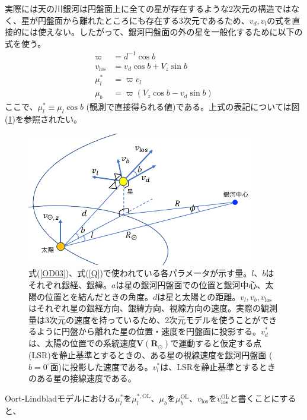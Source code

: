 実際には天の川銀河は円盤面上に全ての星が存在するような2次元の構造ではなく、星が円盤面から離れたところにも存在する3次元であるため、$v_d,v_l$の式を直接的には使えない。したがって、銀河円盤面の外の星を一般化するために以下の式を使う。
\begin{subequations}
\begin{align}
	\varpi &= d^{-1} \cos b \\
	v_{\mathrm{los}} &= v_d \cos b + V_z \sin b\\
	\mu^*_l &= \varpi v_l \\
	\mu_b &= \varpi(V_z \cos b - v_d \sin b)
\end{align} \label{OD03}
\end{subequations}
ここで、$\mu^*_l \equiv \mu_l \cos b$ (観測で直接得られる値)である。上式の表記については図(\ref{fig:OD03})を参照されたい。
\begin{figure}[htbp]
\begin{center}
	\includegraphics[width=10cm]{fig/figOD2003.pdf}
	\caption{式(\ref{OD03})、式(\ref{Q})で使われている各パラメータが示す量。$l、b$はそれぞれ銀経、銀緯。$a$は星の銀河円盤面での位置と銀河中心、太陽の位置とを結んだときの角度。$d$は星と太陽との距離。$v_l,v_b,v_{\mathrm{los}}$はそれぞれ星の銀経方向、銀緯方向、視線方向の速度。実際の観測量は3次元の速度を持っているため、2次元モデルを使うことができるように円盤から離れた星の位置・速度を円盤面に投影する。$v^*_d$は、太陽の位置での系統速度$\pmb{V}(\pmb{R}_{\odot})$で運動すると仮定する点 (LSR)を静止基準とするときの、ある星の視線速度を銀河円盤面 ($b=0^{\circ}$面)に投影した速度である。$v^*_l$は、LSRを静止基準とするときのある星の接線速度である。}
	\label{fig:OD03}
\end{center}
\end{figure}
Oort-Lindbladモデルにおける$\mu^*_l$を$\mu^{*,\mathrm{OL}}_l$、$\mu_b$を$\mu^{\mathrm{OL}}_b$、$v_{\mathrm{los}}$を$v^{\mathrm{OL}}_{\mathrm{los}}$と書くことにすると、
